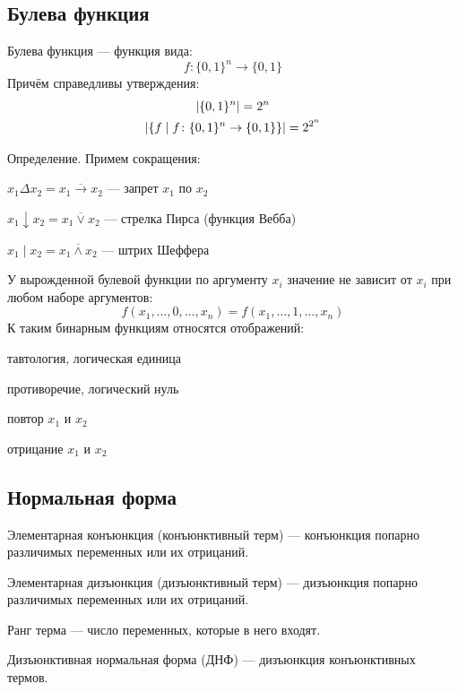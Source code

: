 \subsection{Булева функция}

{\bold Булева функция} --- функция вида:
$$f\colon\{0,1\}^n\to\{0,1\}$$
Причём справедливы утверждения:
$$\begin{gathered}
\left|\{0,1\}^n\right|=2^n\\
\left|\{f\mid f\colon\{0,1\}^n\to\{0,1\}\}\right|=2^{2^n}
\end{gathered}$$
\begin{theorem}
{\bold Определение.} Примем сокращения:
\begin{list*}[][\#]
\item $x_1\Delta x_2=\overline{x_1\to x_2}$ --- запрет $x_1$ по $x_2$
\item $x_1\downarrow x_2=\overline{x_1\lor x_2}$ --- стрелка Пирса {\ital (функция Вебба)}
\item $x_1\mid x_2=\overline{x_1\land x_2}$ --- штрих Шеффера
\end{list*}
\end{theorem}
У {\bold вырожденной} булевой функции по аргументу $x_i$ значение {\ital не зависит} от $x_i$ при любом наборе аргументов:
$$f(x_1,\dots,0,\dots,x_n)=f(x_1,\dots,1,\dots,x_n)$$
К таким бинарным функциям относятся { отображений}:
\begin{list*}
\item {\bold тавтология}, логическая единица
\item {\bold противоречие}, логический нуль
\item {\bold повтор} $x_1$ и $x_2$
\item {\bold отрицание} $x_1$ и $x_2$
\end{list*}

\subsection{Нормальная форма}

{\bold Элементарная конъюнкция} {\ital (конъюнктивный терм)} --- конъюнкция попарно различимых переменных или их отрицаний.

{\bold Элементарная дизъюнкция} {\ital (дизъюнктивный терм)} --- дизъюнкция попарно различимых переменных или их отрицаний.

{\bold Ранг терма} --- число переменных, которые в него входят.

{\bold Дизъюнктивная нормальная форма} {\ital (ДНФ)} --- дизъюнкция конъюнктивных термов.

